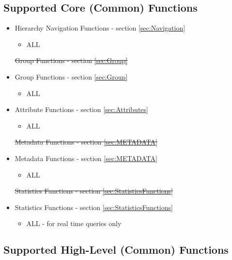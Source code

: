 \documentclass[12pt]{report} %
\providecommand{\DIFdeltex}[1]{{\protect\color{red}\sout{#1}}}                      %
\providecommand{\DIFaddbegin}{} %
\providecommand{\DIFaddend}{} %
\providecommand{\DIFdelbegin}{} %
\providecommand{\DIFdelend}{} %
\providecommand{\DIFdel}[1]{\texorpdfstring{\DIFdeltex{#1}}{}} %
\newcommand{\DIFscaledelfig}{0.5}
\newlength{\DIFdelgraphicswidth} %
\newlength{\DIFdelgraphicsheight} %
\newcommand{\DIFaddincludegraphics}[2][]{{\color{blue}\fbox{\DIFOincludegraphics[#1]{#2}}}} %
\newcommand{\DIFdelincludegraphics}[2][]{%
\sbox{\DIFdelgraphicsbox}{\DIFOincludegraphics[#1]{#2}}%
\settoboxwidth{\DIFdelgraphicswidth}{\DIFdelgraphicsbox} %
\settoboxtotalheight{\DIFdelgraphicsheight}{\DIFdelgraphicsbox} %
\scalebox{\DIFscaledelfig}{%
\parbox[b]{\DIFdelgraphicswidth}{\usebox{\DIFdelgraphicsbox}\\[-\baselineskip] \rule{\DIFdelgraphicswidth}{0em}}\llap{\resizebox{\DIFdelgraphicswidth}{\DIFdelgraphicsheight}{%
\setlength{\unitlength}{\DIFdelgraphicswidth}%
\begin{picture}(1,1)%
\thicklines\linethickness{2pt} %
{\color[rgb]{1,0,0}\put(0,0){\framebox(1,1){}}}%
{\color[rgb]{1,0,0}\put(0,0){\line( 1,1){1}}}%
{\color[rgb]{1,0,0}\put(0,1){\line(1,-1){1}}}%
\end{picture}%
}\hspace*{3pt}}} %
} %
\DeclareRobustCommand{\DIFaddbegin}{\DIFOaddbegin \let\includegraphics\DIFaddincludegraphics} %
\DeclareRobustCommand{\DIFaddend}{\DIFOaddend \let\includegraphics\DIFOincludegraphics} %
\DeclareRobustCommand{\DIFdelbegin}{\DIFOdelbegin \let\includegraphics\DIFdelincludegraphics} %
\DeclareRobustCommand{\DIFdelend}{\DIFOaddend \let\includegraphics\DIFOincludegraphics} %
\begin{document}
\DIFdelend \subsection{Supported Core (Common) Functions}\label{sec:OSHWSupportedCommon}

\begin{itemize}[noitemsep,nolistsep] 
	\item{Hierarchy Navigation Functions - section \ref{sec:Navigation}}
		\begin{itemize}[noitemsep,nolistsep] 
			\item{ALL}
		\end{itemize}
	\DIFdelbegin %
\DIFdel{Group Functions - section \ref{sec:Group}
	}\DIFdelend \DIFaddbegin \item{Group Functions - section \ref{sec:Group}}
		\DIFaddend \begin{itemize}[noitemsep,nolistsep] 
			\item{ALL}
		\end{itemize}
	\item{Attribute Functions - section \ref{sec:Attributes}}
		\begin{itemize}[noitemsep,nolistsep] 
			\item{ALL}
		\end{itemize}
	\DIFdelbegin %
\DIFdel{Metadata Functions - section \ref{sec:METADATA}
	}\DIFdelend \DIFaddbegin \item{Metadata Functions - section \ref{sec:METADATA}}
		\DIFaddend \begin{itemize}[noitemsep,nolistsep] 
			\item{ALL}
		\end{itemize}
	\DIFdelbegin %
\DIFdel{Statistics Functions - section \ref{sec:StatisticsFunctions}
	}\DIFdelend \DIFaddbegin \item{Statistics Functions - section \ref{sec:StatisticsFunctions}}
		\DIFaddend \begin{itemize}[noitemsep,nolistsep] 
			\item{ALL - for real time queries only}
		\end{itemize}
\end{itemize}


\subsection{Supported High-Level (Common) Functions}\label{sec:OSHWHighLevel}
\end{document}

